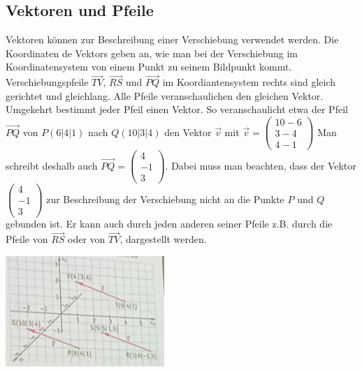 \subsection{Vektoren und Pfeile}
Vektoren können zur Beschreibung einer Verschiebung verwendet werden. Die Koordinaten de Vektors geben an, wie man bei der Verschiebung im Koordinatensystem von einem Punkt zu seinem Bildpunkt kommt. Verschiebungspfeile $\vec{TV}$, $\vec{RS}$ und $\vec{PQ}$ im Koordiantensystem rechts sind gleich gerichtet und gleichlang. Alle Pfeile veranschaulichen den gleichen Vektor. Umgekehrt bestimmt jeder Pfeil einen Vektor. So veranschaulicht etwa der Pfeil $\vec{PQ}$ von $P(6|4|1)$ nach $Q(10|3|4)$ den Vektor $\vec{v}$ mit $\vec{v}=\begin{pmatrix}
	10-6\\3-4\\4-1
\end{pmatrix}$
Man schreibt deshalb auch $\vec{PQ}=\begin{pmatrix}
	4\\-1\\3
\end{pmatrix}$. Dabei muss man beachten, dass der Vektor $\begin{pmatrix}
	4\\-1\\3
\end{pmatrix}$ zur Beschreibung der Verschiebung nicht an die Punkte $P$ und $Q$ gebunden ist. Er kann auch durch jeden anderen seiner Pfeile z.B. durch die Pfeile von $\vec{RS}$ oder von $\vec{TV}$, dargestellt werden. 
\begin{center}
	\includegraphics[width=6cm]{Media/VektorUndPunkt}
\end{center}



